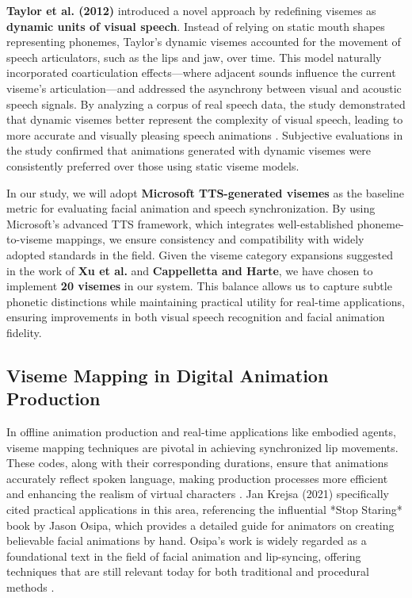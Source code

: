 \documentclass[12pt]{article}
\begin{document}
\textbf{Taylor et al. (2012)} introduced a novel approach by redefining visemes as \textbf{dynamic units of visual speech}. Instead of relying on static mouth shapes representing phonemes, Taylor’s dynamic visemes accounted for the movement of speech articulators, such as the lips and jaw, over time. This model naturally incorporated coarticulation effects—where adjacent sounds influence the current viseme’s articulation—and addressed the asynchrony between visual and acoustic speech signals. By analyzing a corpus of real speech data, the study demonstrated that dynamic visemes better represent the complexity of visual speech, leading to more accurate and visually pleasing speech animations \cite{taylor2012}. Subjective evaluations in the study confirmed that animations generated with dynamic visemes were consistently preferred over those using static viseme models.

In our study, we will adopt \textbf{Microsoft TTS-generated visemes} as the baseline metric for evaluating facial animation and speech synchronization. By using Microsoft’s advanced TTS framework, which integrates well-established phoneme-to-viseme mappings, we ensure consistency and compatibility with widely adopted standards in the field. Given the viseme category expansions suggested in the work of \textbf{Xu et al.} and \textbf{Cappelletta and Harte}, we have chosen to implement \textbf{20 visemes} in our system. This balance allows us to capture subtle phonetic distinctions while maintaining practical utility for real-time applications, ensuring improvements in both visual speech recognition and facial animation fidelity.
\subsection{Viseme Mapping in Digital Animation Production}
\label{sec:useinprod}
In offline animation production and real-time applications like embodied agents, viseme mapping techniques are pivotal in achieving synchronized lip movements. These codes, along with their corresponding durations, ensure that animations accurately reflect spoken language, making production processes more efficient and enhancing the realism of virtual characters \cite{StopStaringBook}. Jan Krejsa (2021) specifically cited practical applications in this area, referencing the influential *Stop Staring* book by Jason Osipa, which provides a detailed guide for animators on creating believable facial animations by hand. Osipa's work is widely regarded as a foundational text in the field of facial animation and lip-syncing, offering techniques that are still relevant today for both traditional and procedural methods \cite{JanK2021}.
\end{document}
